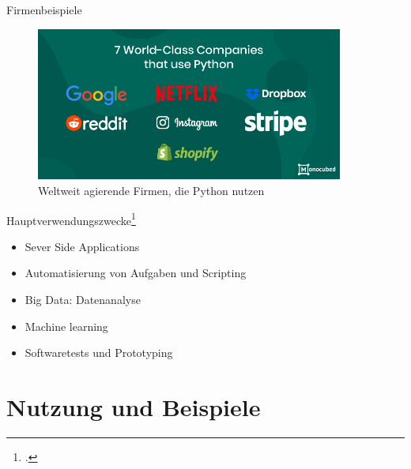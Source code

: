 \documentclass[10pt,ngerman]{beamer}
\begin{document}
\begin{frame}[fragile]{Firmenbeispiele}
  \begin{figure}
    \centering
    \includegraphics[width=0.9\textwidth]{pictures/who_uses_python.png}
    \caption[Weltweit agierende Firmen, die Python nutzen, https://www.monocubed.com/companies-that-use-python/, abgerufen am 16.11.2021 ]{Weltweit agierende Firmen, die Python nutzen}
  \end{figure}
\end{frame}

\begin{frame}[fragile]{Hauptverwendungszwecke\footcite{coursera:pythonPopularity}}
  \begin{itemize}
    \item Sever Side Applications
    \item Automatisierung von Aufgaben und Scripting
    \item Big Data: Datenanalyse
    \item Machine learning
    \item Softwaretests und Prototyping
  \end{itemize}
\end{frame}

\section{Nutzung und Beispiele}
\end{document}

